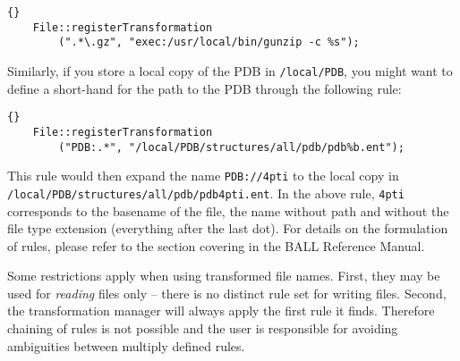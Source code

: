 \begin{lstlisting}{}
	File::registerTransformation
		(".*\.gz", "exec:/usr/local/bin/gunzip -c %s");
\end{lstlisting}

\noindent
Similarly, if you store a local copy of the PDB in {\tt /local/PDB}, you might
want to define a short-hand for the path to the PDB through the following
rule:

\begin{lstlisting}{}
	File::registerTransformation
		("PDB:.*", "/local/PDB/structures/all/pdb/pdb%b.ent");
\end{lstlisting}

\noindent
This rule would then expand the name {\tt PDB://4pti} to the local copy
in {\tt /local/PDB/structures/all/pdb/pdb4pti.ent}. In the above rule, 
{\tt 4pti} corresponds  to the basename of the file, \ie the name without path 
and without the file type extension (everything after the last dot).
For details on the formulation of rules, please refer to the section
covering  in the BALL Reference Manual.

Some restrictions apply when using transformed file names. First, they may
be used for {\em reading} files only -- there is no distinct rule set for
writing files. Second, the transformation manager will always apply the first 
rule it finds. Therefore chaining of rules is not possible and the user
is responsible for avoiding ambiguities between multiply defined rules.
